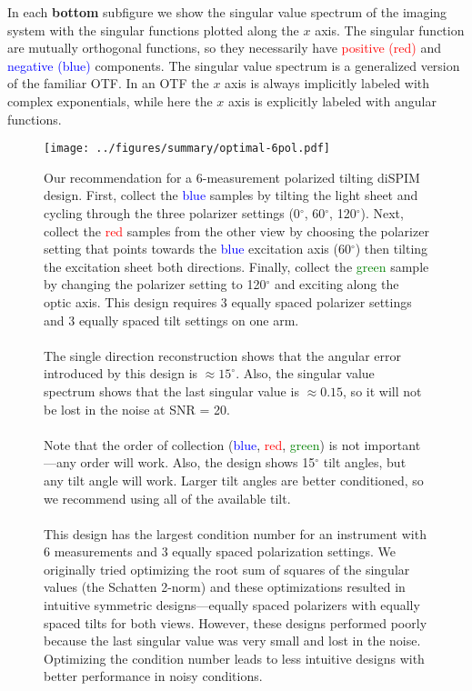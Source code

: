 \documentclass[11pt]{article}
\begin{document}
In each \textbf{bottom} subfigure we show the singular value spectrum of the
imaging system with the singular functions plotted along the $x$ axis. The
singular function are mutually orthogonal functions, so they necessarily have
\textcolor{red}{positive (red)} and \textcolor{blue}{negative (blue)}
components. The singular value spectrum is a generalized version of the familiar
OTF. In an OTF the $x$ axis is always implicitly labeled with complex
exponentials, while here the $x$ axis is explicitly labeled with angular
functions.

\begin{figure}[p]
 \captionsetup{width=1.0\linewidth}
 \centering
 \texttt{[image: ../figures/summary/optimal-6pol.pdf]}
 \vspace{-1.5em}
 \caption{Our recommendation for a 6-measurement polarized tilting diSPIM
   design. First, collect the \textcolor{blue}{blue} samples by tilting the
   light sheet and cycling through the three polarizer settings (0${}^{\circ}$,
   60${}^{\circ}$, 120${}^{\circ}$). Next, collect the \textcolor{red}{red}
   samples from the other view by choosing the polarizer setting that points
   towards the \textcolor{blue}{blue} excitation axis (60${}^{\circ}$) then
   tilting the excitation sheet both directions. Finally, collect the
   \textcolor{green}{green} sample by changing the polarizer setting to
   120${}^{\circ}$ and exciting along the optic axis. This design requires 3 equally spaced polarizer settings and 3 equally spaced tilt settings on one arm.\\ \\
   The single direction reconstruction shows that the angular error introduced
   by this design is $\approx 15^{\circ}$. Also, the singular value spectrum
   shows that the last singular value is $\approx 0.15$, so it will not be lost
   in the
   noise at SNR = 20.\\ \\
   Note that the order of collection (\textcolor{blue}{blue},
   \textcolor{red}{red}, \textcolor{green}{green}) is not important---any order
   will work. Also, the design shows 15${}^{\circ}$ tilt angles, but any tilt
   angle will work. Larger tilt angles are better conditioned, so we recommend
   using all of the available tilt.\\ \\
   This design has the largest condition number for an instrument with 6
   measurements and 3 equally spaced polarization settings. We originally tried
   optimizing the root sum of squares of the singular values (the Schatten
   2-norm) and these optimizations resulted in intuitive symmetric
   designs---equally spaced polarizers with equally spaced tilts for both views.
   However, these designs performed poorly because the last singular value was
   very small and lost in the noise. Optimizing the condition number leads to
   less intuitive designs with better performance in noisy conditions.}
 \label{6pol}
\end{figure}
\end{document}
